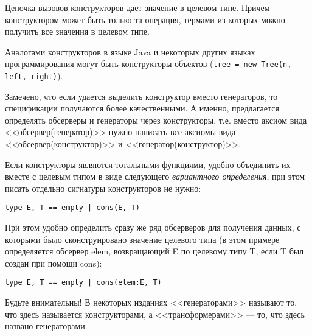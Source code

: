 Цепочка вызовов конструкторов дает значение в целевом типе. Причем конструктором может быть только та операция, термами из которых можно получить все значения в целевом типе.

Аналогами конструкторов в языке Java и некоторых других языках программирования могут быть конструкторы объектов (\texttt{tree = new Tree(n, left, right)}).

Замечено, что если удается выделить конструктор вместо генераторов, то спецификации получаются более качественными. А именно, предлагается определять обсерверы и генераторы через конструкторы, т.е. вместо аксиом вида <<обсервер(генератор)>> нужно написать все аксиомы вида <<обсервер(конструктор)>> и <<генератор(конструктор)>>.

Если конструкторы являются тотальными функциями, удобно объединить их вместе с целевым типом в виде следующего \emph{вариантного определения}, при этом писать отдельно сигнатуры конструкторов не нужно:
\begin{lstlisting}
type E, T == empty | cons(E, T)
\end{lstlisting}

При этом удобно определить сразу же ряд обсерверов для получения данных, с которыми было сконструировано значение целевого типа (в этом примере определяется обсервер elem, возвращающий E по целевому типу T, если T был создан при помощи cons):
\begin{lstlisting}
type E, T == empty | cons(elem:E, T)
\end{lstlisting}

Будьте внимательны! В некоторых изданиях <<генераторами>> называют то, что здесь называется конструкторами, а <<трансформерами>> --- то, что здесь названо генераторами.


